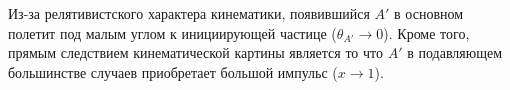 



Из-за релятивистского характера кинематики, появившийся $A'$ в основном полетит
под малым углом к инициирующей частице ($\theta_{A'} \rightarrow 0$). Кроме
того, прямым следствием кинематической картины является то что $A'$ в подавляющем
большинстве случаев приобретает большой импульс ($x \rightarrow 1$).


